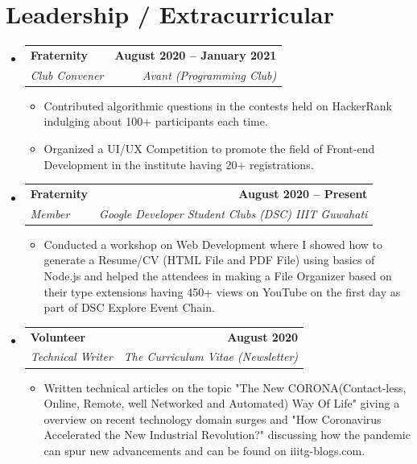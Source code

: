 \documentclass[letterpaper,11pt]{article}
\makeatletter
\newcommand{\resumeItem}[1]{
  \item\small{
    {#1 \vspace{-2pt}}
  }
}
\newcommand{\resumeSubheading}[4]{
  \vspace{-2pt}\item
    \begin{tabular*}{1.0\textwidth}[t]{l@{\extracolsep{\fill}}r}
      \textbf{#1} & \textbf{\small #2} \\
      \textit{\small#3} & \textit{\small #4} \\
    \end{tabular*}\vspace{-7pt}
}
\newcommand{\resumeSubHeadingListStart}{\begin{itemize}[leftmargin=0.0in, label={}]}
\newcommand{\resumeSubHeadingListEnd}{\end{itemize}}
\newcommand{\resumeItemListStart}{\begin{itemize}}
\newcommand{\resumeItemListEnd}{\end{itemize}\vspace{-5pt}}
\makeatother
\begin{document}
\section{Leadership / Extracurricular}
    \resumeSubHeadingListStart
        \resumeSubheading{Fraternity}{August 2020 -- January 2021}{Club Convener}{Avant (Programming Club)}
            \resumeItemListStart
                \resumeItem{Contributed algorithmic questions in the contests held on HackerRank indulging about 100+ participants each time.}
                \resumeItem{Organized a UI/UX Competition to promote the field of Front-end Development in the institute having 20+ registrations.}
            \resumeItemListEnd
        \resumeSubheading{Fraternity}{August 2020 -- Present}{Member}{Google Developer Student Clubs (DSC) IIIT Guwahati}
            \resumeItemListStart
                \resumeItem{Conducted a workshop on Web Development where I showed how to generate a Resume/CV (HTML File and PDF File) using basics of Node.js and helped the attendees in making a File Organizer based on their type extensions having 450+ views on YouTube on the first day as part of DSC Explore Event Chain.}
            \resumeItemListEnd
        \resumeSubheading{Volunteer}{August 2020}{Technical Writer}{The Curriculum Vitae (Newsletter)}
            \resumeItemListStart
                \resumeItem{Written technical articles on the topic "The New CORONA(Contact-less, Online, Remote, well Networked and Automated) Way Of Life" giving a overview on recent technology domain surges and "How Coronavirus Accelerated the New Industrial Revolution?" discussing how the pandemic can spur new advancements and can be found on iiitg-blogs.com.}
            \resumeItemListEnd
        
    \resumeSubHeadingListEnd
\end{document}
